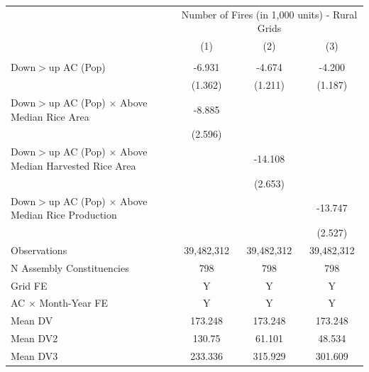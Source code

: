 \begin{tabular}{lccc}
      \hline
       & \multicolumn{3}{c}{Number of Fires (in 1,000 units) - Rural Grids}\\
                                                              & (1)            & (2)            & (3)\\\\  
      \midrule

Down$>$up AC (Pop)&      -6.931\sym{***}&      -4.674\sym{***}&      -4.200\sym{***}\\
            &     (1.362)         &     (1.211)         &     (1.187)         \\
Down$>$up AC (Pop) $\times$ Above Median Rice Area&      -8.885\sym{***}&                     &                     \\
            &     (2.596)         &                     &                     \\
Down$>$up AC (Pop) $\times$ Above Median Harvested Rice Area&                     &     -14.108\sym{***}&                     \\
            &                     &     (2.653)         &                     \\
Down$>$up AC (Pop) $\times$ Above Median Rice Production&                     &                     &     -13.747\sym{***}\\
            &                     &                     &     (2.527)         \\
\hline
Observations&  39,482,312         &  39,482,312         &  39,482,312         \\
N Assembly Constituencies&         798         &         798         &         798         \\
Grid FE     &           Y         &           Y         &           Y         \\
AC $\times$ Month-Year FE&           Y         &           Y         &           Y         \\
Mean DV     &     173.248         &     173.248         &     173.248         \\
Mean DV2    &      130.75         &      61.101         &      48.534         \\
Mean DV3    &     233.336         &     315.929         &     301.609         \\
\hline
\end{tabular}
